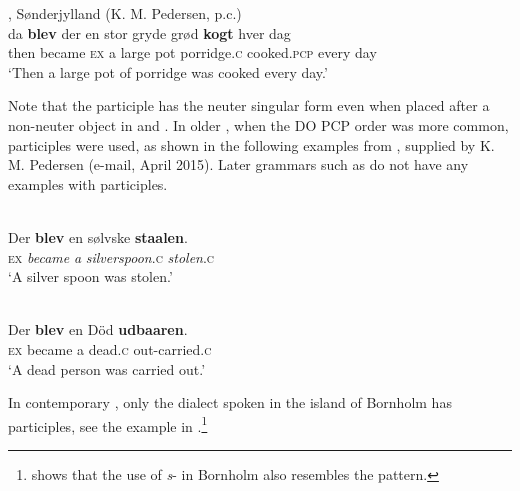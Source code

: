 \documentclass[output=paper]{LSP/langsci}
\begin{document}
\ea%
\label{ex:engdahl:16}
, Sønderjylland  (K. M. Pedersen, p.c.)\\
\gll da     \textbf{blev}  der en stor   gryde   grød      \textbf{kogt}    hver     dag  \\
    then  became \textsc{ex}  a   large    pot porridge\textsc{.c}  {cooked}\textsc{.pcp}  every  day\\
    \glt ‘Then a large  pot of porridge was  cooked  every day.'
\z

\noindent Note that the participle has the neuter singular form even when placed after a non-neuter object in  and . In older , when the DO PCP order was more common,  participles were used, as shown in the following examples from \citet{Høysgaard1752}, supplied by K. M. Pedersen (e-mail, April 2015). Later grammars such as \citet{Mikkelsen1894,Mikkelsen1911} do not have any examples with  participles.

\ea%
    \label{ex:engdahl:17}
     \citep[327]{Høysgaard1752}\\
    
    \gll Der \textbf{blev} en sølvske \textbf{staalen}.\\
	 \textsc{ex} \textit{became}  \textit{a} \textit{silverspoon}\textsc{.c}  \textit{stolen}\textsc{.c}\\
     \glt ‘A silver spoon was stolen.'\\
     \z

     \newpage 
\ea
\label{ex:engdahl:17b}
 \citep[345]{Høysgaard1752}\\
\gll     Der \textbf{blev}     en   Död  \textbf{udbaaren}.  \\
     \textsc{ex}  became  a    dead\textsc{.c}   {out-carried}\textsc{.c}\\
     \glt ‘A dead person was carried out.'
\z


\noindent In contemporary , only the dialect spoken in the island of Bornholm has  participles, see the example in  .\footnote{\citet{Pedersen2013} shows that the use of \textit{s}{}- in Bornholm also resembles the  pattern.}
\end{document}
